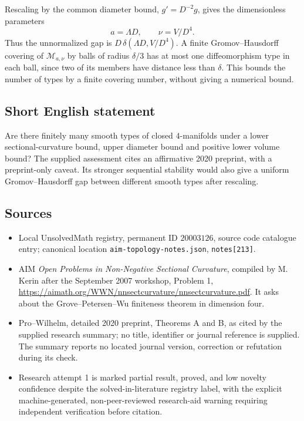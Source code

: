 \documentclass[11pt]{article}
\begin{document}
Rescaling by the common diameter bound, $g'=D^{-2}g$, gives the dimensionless parameters
\[
 a=\Lambda D,\qquad\nu=V/D^4.
\]
Thus the unnormalized gap is $D\,\delta(\Lambda D,V/D^4)$. A finite Gromov--Hausdorff covering of $\mathcal M_{a,\nu}$ by balls of radius $\delta/3$ has at most one diffeomorphism type in each ball, since two of its members have distance less than $\delta$. This bounds the number of types by a finite covering number, without giving a numerical bound.
\subsection{Short English statement}
Are there finitely many smooth types of closed $4$-manifolds under a lower sectional-curvature bound, upper diameter bound and positive lower volume bound? The supplied assessment cites an affirmative 2020 preprint, with a preprint-only caveat. Its stronger sequential stability would also give a uniform Gromov--Hausdorff gap between different smooth types after rescaling.
\subsection{Sources}
\begin{itemize}
\item Local UnsolvedMath registry, permanent ID $20003126$, source code catalogue entry; canonical location \texttt{aim-topology-notes.json}, \texttt{notes[213]}.
\item AIM \emph{Open Problems in Non-Negative Sectional Curvature}, compiled by M. Kerin after the September 2007 workshop, Problem 1, \url{https://aimath.org/WWN/nnsectcurvature/nnsectcurvature.pdf}. It asks about the Grove--Petersen--Wu finiteness theorem in dimension four.
\item Pro--Wilhelm, detailed 2020 preprint, Theorems A and B, as cited by the supplied research summary; no title, identifier or journal reference is supplied. The summary reports no located journal version, correction or refutation during its check.
\item Research attempt 1 is marked partial result, proved, and low novelty confidence despite the solved-in-literature registry label, with the explicit machine-generated, non-peer-reviewed research-aid warning requiring independent verification before citation.
\end{itemize}
\end{document}
